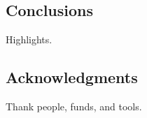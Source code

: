 \documentclass[a0]{sciposter} %
\begin{document}
\begin{multicols}{2}
\section{Conclusions}

Highlights.

\lipsum[4]

\subsection*{Acknowledgments}

Thank people, funds, and tools.

\lipsum[1]

\end{multicols}



\end{document}
